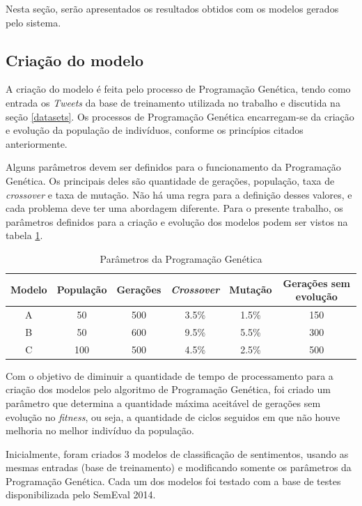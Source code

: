 \documentclass[12pt]{article}
\begin{document}
Nesta seção, serão apresentados os resultados obtidos com os modelos gerados pelo sistema. 

\subsection{Criação do modelo}

A criação do modelo é feita pelo processo de Programação Genética, tendo como entrada os \emph{Tweets} da base de treinamento utilizada no trabalho e discutida na seção \ref{datasets}. Os processos de Programação Genética encarregam-se da criação e evolução da população de indivíduos, conforme os princípios citados anteriormente.

Alguns parâmetros devem ser definidos para o funcionamento da Programação Genética. Os principais deles são quantidade de gerações, população, taxa de \emph{crossover} e taxa de mutação. Não há uma regra para a definição desses valores, e cada problema deve ter uma abordagem diferente. Para o presente trabalho, os parâmetros definidos para a criação e evolução dos modelos podem ser vistos na tabela \ref{parametersGP}.

\begin{table}[H]
	\centering
	\begin{tabular}{cccccc}
	\textbf{Modelo} & \textbf{População} & \textbf{Gerações} & \textbf{\emph{Crossover}} & \textbf{Mutação} & \textbf{Gerações sem evolução} \\ \hline
	A & 50 & 500 & 3.5\% & 1.5\% & 150 \\ \hline
	B & 50 & 600 & 9.5\% & 5.5\% & 300 \\ \hline
	C & 100 & 500 & 4.5\% & 2.5\% & 500 \\ \hline
	\end{tabular}
	\caption{Parâmetros da Programação Genética}
	\label{parametersGP}
\end{table}

Com o objetivo de diminuir a quantidade de tempo de processamento para a criação dos modelos pelo algoritmo de Programação Genética, foi criado um parâmetro que determina a quantidade máxima aceitável de gerações sem evolução no \emph{fitness}, ou seja, a quantidade de ciclos seguidos em que não houve melhoria no melhor indivíduo da população. 

Inicialmente, foram criados 3 modelos de classificação de sentimentos, usando as mesmas entradas (base de treinamento) e modificando somente os parâmetros da Programação Genética. Cada um dos modelos foi testado com a base de testes disponibilizada pelo SemEval 2014.
\end{document}
